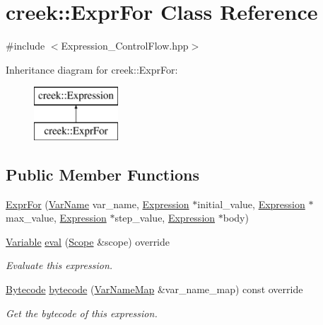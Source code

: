 \hypertarget{classcreek_1_1_expr_for}{}\section{creek\+:\+:Expr\+For Class Reference}
\label{classcreek_1_1_expr_for}


{\ttfamily \#include $<$Expression\+\_\+\+Control\+Flow.\+hpp$>$}

Inheritance diagram for creek\+:\+:Expr\+For\+:\begin{figure}[H]
\begin{center}
\leavevmode
\includegraphics[height=2.000000cm]{classcreek_1_1_expr_for}
\end{center}
\end{figure}
\subsection*{Public Member Functions}
\begin{DoxyCompactItemize}
\item 
\hyperlink{classcreek_1_1_expr_for_aa3b329ab8038f74c5ad88273d7c006cc}{Expr\+For} (\hyperlink{classcreek_1_1_var_name}{Var\+Name} var\+\_\+name, \hyperlink{classcreek_1_1_expression}{Expression} $\ast$initial\+\_\+value, \hyperlink{classcreek_1_1_expression}{Expression} $\ast$max\+\_\+value, \hyperlink{classcreek_1_1_expression}{Expression} $\ast$step\+\_\+value, \hyperlink{classcreek_1_1_expression}{Expression} $\ast$body)
\item 
\hyperlink{classcreek_1_1_variable}{Variable} \hyperlink{classcreek_1_1_expr_for_a98b3d4c28039a4b5f88917fd780727e2}{eval} (\hyperlink{classcreek_1_1_scope}{Scope} \&scope) override
\begin{DoxyCompactList}\small\item\em Evaluate this expression. \end{DoxyCompactList}\item 
\hyperlink{classcreek_1_1_bytecode}{Bytecode} \hyperlink{classcreek_1_1_expr_for_a2f7159f87a5c432536b7c6018d3213e6}{bytecode} (\hyperlink{classcreek_1_1_var_name_map}{Var\+Name\+Map} \&var\+\_\+name\+\_\+map) const  override\hypertarget{classcreek_1_1_expr_for_a2f7159f87a5c432536b7c6018d3213e6}{}\label{classcreek_1_1_expr_for_a2f7159f87a5c432536b7c6018d3213e6}

\begin{DoxyCompactList}\small\item\em Get the bytecode of this expression. \end{DoxyCompactList}\end{DoxyCompactItemize}


